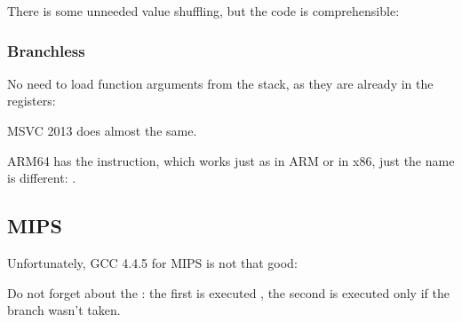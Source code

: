 

There is some unneeded value shuffling, but the code is comprehensible:



\subsubsection{Branchless}

No need to load function arguments from the stack, as they are already in the registers:



MSVC 2013 does almost the same.


ARM64 has the  instruction, which works just as  in ARM or  in x86, just the name is different:
.



\ifdefined\IncludeMIPS
\subsection{MIPS}

Unfortunately, GCC 4.4.5 for MIPS is not that good:



Do not forget about the : the first  is executed  , 
the second  is executed only if the branch wasn't taken.

\fi %

